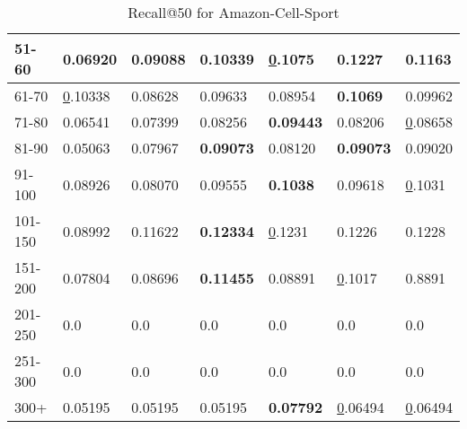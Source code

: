 \begin{table*}[]
\begin{tabular}{|l|l|l|l|l|l|l|}
    51-60     & 0.06920                        & 0.09088                        & 0.10339                        & {\ul 0.1075}                   & \textbf{0.1227}                & 0.1163                         \\ \hline
    61-70     & {\ul 0.10338}                  & 0.08628                        & 0.09633                        & 0.08954                        & \textbf{0.1069}                & 0.09962                        \\ \hline
    71-80     & 0.06541                        & 0.07399                        & 0.08256                        & \textbf{0.09443}               & 0.08206                        & {\ul 0.08658}                  \\ \hline
    81-90     & 0.05063                        & 0.07967                        & \textbf{0.09073}               & 0.08120                        & \textbf{0.09073}               & 0.09020                        \\ \hline
    91-100    & 0.08926                        & 0.08070                        & 0.09555                        & \textbf{0.1038}                & 0.09618                        & {\ul 0.1031}                   \\ \hline
    101-150   & 0.08992                        & 0.11622                        & \textbf{0.12334}               & {\ul 0.1231}                   & 0.1226                         & 0.1228                         \\ \hline
    151-200   & 0.07804                        & 0.08696                        & \textbf{0.11455}               & 0.08891                        & {\ul 0.1017}                   & 0.8891                         \\ \hline
    201-250   & 0.0                            & 0.0                            & 0.0                            & 0.0                            & 0.0                            & 0.0                            \\ \hline
    251-300   & 0.0                            & 0.0                            & 0.0                            & 0.0                            & 0.0                            & 0.0                            \\ \hline
    300+      & 0.05195                        & 0.05195                        & 0.05195                        & \textbf{0.07792}               & {\ul 0.06494}                  & {\ul 0.06494}                  \\ \hline
    \end{tabular}
    \caption{Recall@50 for Amazon-Cell-Sport}
    \label{tab:Amazon-Cell-Sport-recall-evaluation}
\end{table*}